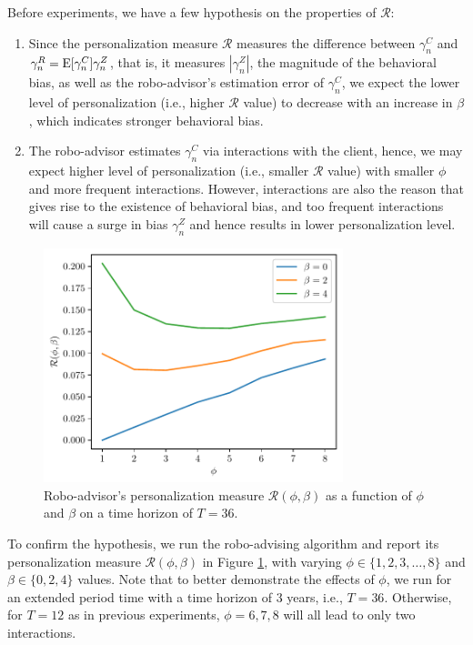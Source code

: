 Before experiments, we have a few hypothesis on the properties of $\mathcal R$:\begin{enumerate}
    \item Since the personalization measure $\mathcal{R}$ measures the difference between $\gamma_n^C$ and $\gamma_n^R=\mathrm{E}[\gamma_n^C]\gamma_n^Z$, that is, it measures $|\gamma_n^Z|$, the magnitude of the behavioral bias, as well as the robo-advisor's estimation error of $\gamma_n^C$, we expect the lower level of personalization (i.e., higher $\mathcal R$ value) to decrease with an increase in $\beta$, which indicates stronger behavioral bias.
    \item The robo-advisor estimates $\gamma_n^C$ via interactions with the client, hence, we may expect higher level of personalization (i.e., smaller $\mathcal R$ value) with smaller $\phi$ and more frequent interactions. However, interactions are also the reason that gives rise to the existence of behavioral bias, and too frequent interactions will cause a surge in bias $\gamma_n^Z$ and hence results in lower personalization level. 
\end{enumerate}

\begin{figure}[t]
    \centering
    \includegraphics[width=87mm]{imgs/personalization.pdf}
    \caption{Robo-advisor's personalization measure $\mathcal R(\phi,\beta)$ as a function of $\phi$ and $\beta$ on a time horizon of $T=36$.}
    \label{fig:personalization}
\end{figure}

To confirm the hypothesis, we run the robo-advising algorithm and report its personalization measure $\mathcal R(\phi,\beta)$ in Figure \ref{fig:personalization}, with varying $\phi\in\{1,2,3,\ldots,8\}$ and $\beta\in\{0,2,4\}$ values. Note that to better demonstrate the effects of $\phi$, we run for an extended period time with a time horizon of 3 years, i.e., $T=36$. Otherwise, for $T=12$ as in previous experiments, $\phi=6,7,8$ will all lead to only two interactions.

